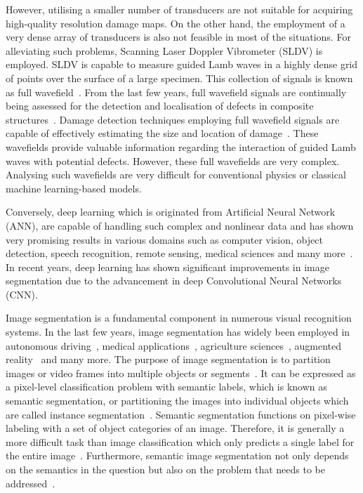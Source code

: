 However, utilising a smaller number of transducers are not suitable for acquiring high-quality resolution damage maps.
On the other hand, the employment of a very dense array of transducers is also not feasible in most of the situations. 
For alleviating such problems, Scanning Laser Doppler Vibrometer (SLDV) is employed. 
SLDV is capable to measure guided Lamb waves in a highly dense grid of points over the surface of a large specimen.
This collection of signals is known as full wavefield~\cite{radzienski2019damage}. 
From the last few years, full wavefield signals are continually being assessed for the detection and localisation of defects in composite
structures~\cite{radzienski2019damage, girolamo2018impact, kudela2018impact, sohn2011delamination, sohn2011automated, rogge2013characterization}.
Damage detection techniques employing full wavefield signals are capable of effectively estimating the size and location of damage~\cite{girolamo2018impact, kudela2018impact}.
These wavefields provide valuable information regarding the interaction of guided Lamb waves with potential defects.  
However, these full wavefields are very complex. 
Analysing such wavefields are very difficult for conventional physics or classical machine learning-based models. 

Conversely, deep learning which is originated from Artificial Neural Network (ANN), are capable of handling such complex and nonlinear data and has shown very promising results in various domains such as computer vision, object detection, speech recognition, remote sensing, medical sciences
and many more~\cite{deng2014deep, mohanty2016using, zhang2020well, pashaei2020review}.
In recent years, deep learning has shown significant improvements in image segmentation due to the advancement in deep Convolutional Neural Networks (CNN).

Image segmentation is a fundamental component in numerous visual recognition
systems. In the last few years, image segmentation has widely been
employed in autonomous driving~\cite{zhang2013understanding, cordts2016cityscapes, ros2016synthia, li2018real}, medical applications~\cite{taghanaki2021deep}, agriculture sciences~\cite{milioto2018real}, augmented reality~\cite{miksik2015semantic} and many more. 
The purpose of image segmentation is to partition images or video frames into multiple objects or segments~\cite{szeliski2010computer}.
It can be expressed as a pixel-level classification problem with semantic labels, which is known as semantic segmentation, or partitioning the images into individual objects which are called instance segmentation~\cite{szeliski2010computer, minaee2021image}. 
Semantic segmentation functions on pixel-wise labeling with a set of object categories of an image. 
Therefore, it is generally a more difficult task than image classification which only predicts a single label for the entire image~\cite{szeliski2010computer, minaee2021image}.
Furthermore, semantic image segmentation not only depends on the semantics in
the question but also on the problem that needs to be addressed~\cite{ghosh2019understanding}.

